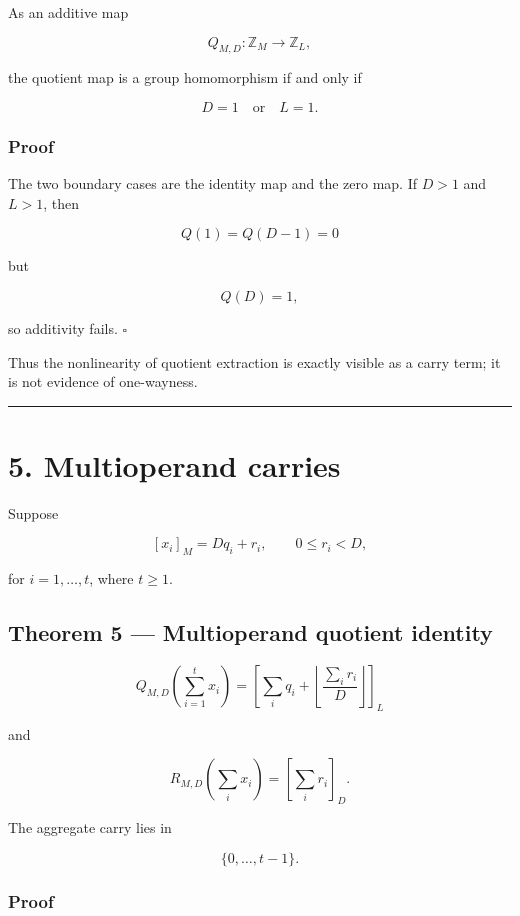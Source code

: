 \documentclass[11pt,a4paper]{article}
\begin{document}
As an additive map

\[
Q_{M,D}:\mathbb Z_M\to\mathbb Z_L,
\]

the quotient map is a group homomorphism if and only if

\[
D=1
\quad\text{or}\quad
L=1.
\]

\subsubsection{Proof}\label{proof-3}

The two boundary cases are the identity map and the zero map. If \(D>1\) and \(L>1\), then

\[
Q(1)=Q(D-1)=0
\]

but

\[
Q(D)=1,
\]

so additivity fails. \(\square\)

Thus the nonlinearity of quotient extraction is exactly visible as a carry term; it is not evidence of one-wayness.

\begin{center}\rule{0.5\linewidth}{0.5pt}\end{center}

\section{5. Multioperand carries}\label{multioperand-carries}

Suppose

\[
[x_i]_M=Dq_i+r_i,\qquad0\le r_i<D,
\]

for \(i=1,\ldots,t\), where \(t\ge1\).

\subsection{Theorem 5 --- Multioperand quotient identity}\label{theorem-5-multioperand-quotient-identity}

\[
\boxed{
Q_{M,D}\!\left(\sum_{i=1}^{t}x_i\right)
=
\left[
\sum_iq_i+
\left\lfloor
\frac{\sum_i r_i}{D}
\right\rfloor
\right]_L
}
\]

and

\[
\boxed{
R_{M,D}\!\left(\sum_i x_i\right)
=
\left[\sum_i r_i\right]_D.
}
\]

The aggregate carry lies in

\[
\{0,\ldots,t-1\}.
\]

\subsubsection{Proof}\label{proof-4}
\end{document}
